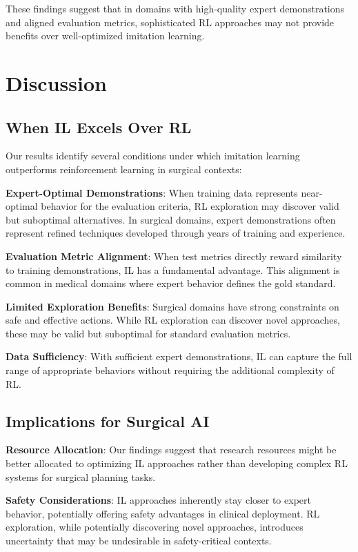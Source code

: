 \documentclass[runningheads]{llncs}
\begin{document}
These findings suggest that in domains with high-quality expert demonstrations and aligned evaluation metrics, sophisticated RL approaches may not provide benefits over well-optimized imitation learning.



\section{Discussion}

\subsection{When IL Excels Over RL}

Our results identify several conditions under which imitation learning outperforms reinforcement learning in surgical contexts:

\textbf{Expert-Optimal Demonstrations}: When training data represents near-optimal behavior for the evaluation criteria, RL exploration may discover valid but suboptimal alternatives. In surgical domains, expert demonstrations often represent refined techniques developed through years of training and experience.

\textbf{Evaluation Metric Alignment}: When test metrics directly reward similarity to training demonstrations, IL has a fundamental advantage. This alignment is common in medical domains where expert behavior defines the gold standard.

\textbf{Limited Exploration Benefits}: Surgical domains have strong constraints on safe and effective actions. While RL exploration can discover novel approaches, these may be valid but suboptimal for standard evaluation metrics.

\textbf{Data Sufficiency}: With sufficient expert demonstrations, IL can capture the full range of appropriate behaviors without requiring the additional complexity of RL.

\subsection{Implications for Surgical AI}

\textbf{Resource Allocation}: Our findings suggest that research resources might be better allocated to optimizing IL approaches rather than developing complex RL systems for surgical planning tasks.

\textbf{Safety Considerations}: IL approaches inherently stay closer to expert behavior, potentially offering safety advantages in clinical deployment. RL exploration, while potentially discovering novel approaches, introduces uncertainty that may be undesirable in safety-critical contexts.
\end{document}
